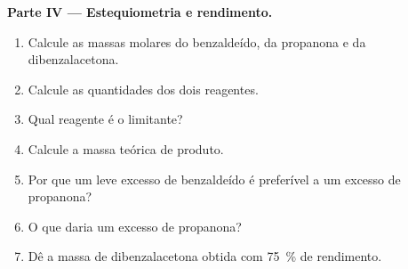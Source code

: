 \begin{problem}
\medskip
\noindent\textbf{Parte IV --- Estequiometria e rendimento.}
\begin{enumerate}[resume]
  \item Calcule as massas molares do benzaldeído, da propanona e da dibenzalacetona.
  \item Calcule as quantidades dos dois reagentes.
  \item Qual reagente é o limitante?
  \item Calcule a massa teórica de produto.
  \item Por que um leve excesso de benzaldeído é preferível a um excesso de propanona?
  \item O que daria um excesso de propanona?
  \item Dê a massa de dibenzalacetona obtida com 75~\% de rendimento.
\end{enumerate}
\end{problem}

